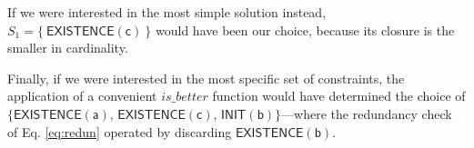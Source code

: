 \begin{example}
If we were interested in the most simple solution instead, $S_1=\{\ \mathsf{EXISTENCE(c)}\ \}$ would have been our choice, because its closure is the smaller in cardinality.

Finally, if we were interested in the most specific set of constraints, the application of a convenient ${is\_better}$ function would have determined the choice of $\{\mathsf{EXISTENCE(a)}$, $\mathsf{EXISTENCE(c)}$, $\mathsf{INIT(b)}\}$---where the redundancy check of Eq. \eqref{eq:redun} operated by discarding $\mathsf{EXISTENCE(b)}$. 
\end{example}

%
%

%

%


%
%
%
%

